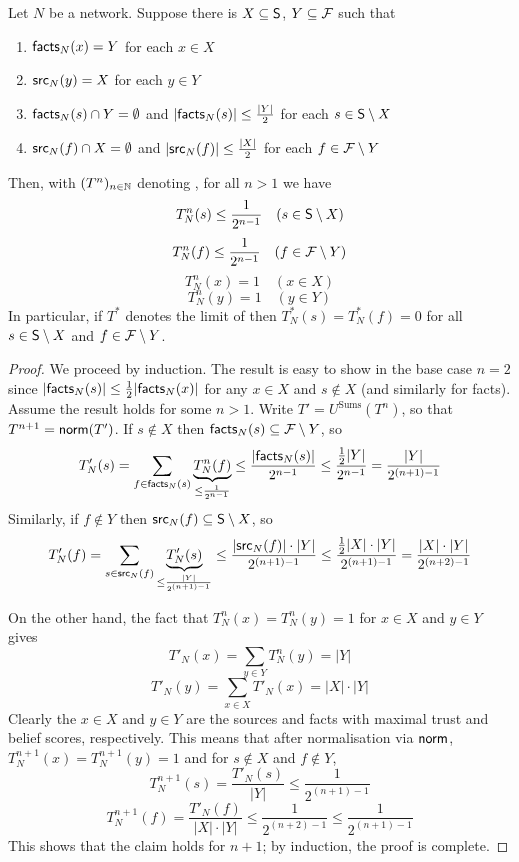 \begin{proposition}
\label{td_prop_obliteration}

Let $N$ be a network. Suppose there is $X \subseteq \S$, $Y \subseteq \F$ such
that
\begin{enumerate}
\item $\facts_N(x) = Y$ for each $x \in X$
\item $\src_N(y) = X$ for each $y \in Y$
\item $\facts_N(s) \cap Y = \emptyset$ and $|\facts_N(s)| \le \frac{|Y|}{2}$
      for each $s \in \S \setminus X$
\item $\src_N(f) \cap X = \emptyset$ and $|\src_N(f)| \le \frac{|X|}{2}$ for
      each $f \in \F \setminus Y$
\end{enumerate}
Then, with $(T^n)_{n \in \Nat}$ denoting \sums{}, for all $n > 1$ we have
    \[ T_N^n(s) \le \frac{1}{2^{n-1}} \quad (s \in \S \setminus X) \]
    \[ T_N^n(f) \le \frac{1}{2^{n-1}} \quad (f \in \F \setminus Y) \]
    \[ T_N^n(x) = 1 \quad (x \in X) \]
    \[ T_N^n(y) = 1 \quad (y \in Y) \]
In particular, if $T^*$ denotes the limit of \sums{} then $T_N^*(s) = T_N^*(f)
= 0$ for all $s \in \S \setminus X$ and $f \in \F \setminus Y$.
\end{proposition}

\begin{proof}

We proceed by induction. The result is easy to show in the base case $n = 2$
since $|\facts_N(s)| \le \frac{1}{2}|\facts_N(x)|$ for any $x \in X$ and $s
\notin X$ (and similarly for facts). Assume the result holds for some $n > 1$.
Write $T' = U^{\text{Sums}}(T^n)$, so that $T^{n+1} = \norm(T')$. If $s \notin
X$ then $\facts_N(s) \subseteq \F \setminus Y$, so
\[
    T'_N(s)
    = \sum_{f \in \facts_N(s)}{
        \underbrace{T^n_N(f)}_{\le \frac{1}{2^{n-1}}}
    }
    \le \frac{|\facts_N(s)|}{2^{n-1}}
    \le \frac{\frac{1}{2}|Y|}{2^{n - 1}}
    = \frac{|Y|}{2^{(n+1) - 1}}
\]
Similarly, if $f \notin Y$ then $\src_N(f) \subseteq \S \setminus X$, so
\[
    T'_N(f)
    = \sum_{s \in \src_N(f)}{
        \underbrace{T'_N(s)}_{\le \frac{|Y|}{2^{(n+1) - 1}}}
    }
    \le \frac{|\src_N(f)| \cdot |Y|}{2^{(n+1) - 1}}
    \le \frac{\frac{1}{2}|X| \cdot |Y|}{2^{(n+1) - 1}}
    = \frac{|X| \cdot |Y|}{2^{(n+2) - 1}}
\]

On the other hand, the fact that $T_N^n(x) = T_N^n(y) = 1$ for $x \in X$ and $y
\in Y$ gives
\[
    T'_N(x)
    = \sum_{y \in Y}{ T^n_N(y) }
    = |Y|
\]
\[
    T'_N(y) = \sum_{x \in X}{T'_N(x)} = |X| \cdot |Y|
\]
Clearly the $x \in X$ and $y \in Y$ are the sources and facts with maximal
trust and belief scores, respectively. This means that after normalisation via
$\norm$, $T_N^{n+1}(x) = T_N^{n+1}(y) = 1$ and for $s \notin X$ and $f \notin
Y$,
\[
    T_N^{n+1}(s)
    = \frac{T'_N(s)}{|Y|}
    \le \frac{1}{2^{(n+1) - 1}}
\]
\[
    T_N^{n+1}(f)
    = \frac{T'_N(f)}{|X| \cdot |Y|}
    \le \frac{1}{2^{(n+2) - 1}}
    \le \frac{1}{2^{(n+1) - 1}}
\]
This shows that the claim holds for $n+1$; by induction, the proof is complete.
\end{proof}

